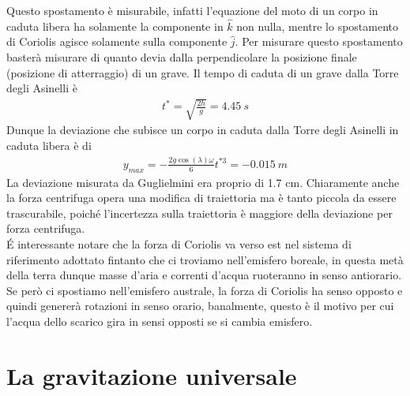 \documentclass[10pt,a4paper]{article}
\begin{document}
Questo spostamento è misurabile, infatti l'equazione del moto di un corpo in caduta libera ha solamente la componente in $\hat{k}$ non nulla, mentre lo spostamento di Coriolis agisce solamente sulla componente $\hat{j}$. Per misurare questo spostamento basterà misurare di quanto devia dalla perpendicolare la posizione finale (posizione di atterraggio) di un grave. Il tempo di caduta di un grave dalla Torre degli Asinelli è 
\begin{align*}
	t^* = \sqrt{\frac{2h}{g}} = 4.45\ s
\end{align*}
Dunque la deviazione che subisce un corpo in caduta dalla Torre degli Asinelli in caduta libera è di
\begin{align*}
	y_{max} = -\frac{2g\cos(\lambda)\omega}{6} t^{*3} = -0.015\ m
\end{align*}
La deviazione misurata da Guglielmini era proprio di 1.7 cm. Chiaramente anche la forza centrifuga opera una modifica di traiettoria ma è tanto piccola da essere trascurabile, poiché l'incertezza sulla traiettoria è maggiore della deviazione per forza centrifuga.\\
\'{E} interessante notare che la forza di Coriolis va verso est nel sistema di riferimento adottato fintanto che ci troviamo nell'emisfero boreale, in questa metà della terra dunque masse d'aria e correnti d'acqua ruoteranno in senso antiorario. Se però ci spostiamo nell'emisfero australe, la forza di Coriolis ha senso opposto e quindi genererà rotazioni in senso orario, banalmente, questo è il motivo per cui l'acqua dello scarico gira in sensi opposti se si cambia emisfero. 
\section{La gravitazione universale}
\end{document}
